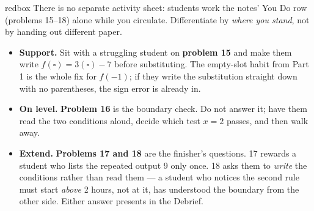 \documentclass[10pt]{article}
\begin{document}
\begin{skillbox}{redbox}
There is no separate activity sheet: students work the notes' You Do row
(problems 15--18) alone while you circulate. Differentiate by \textit{where you
stand}, not by handing out different paper.

\begin{itemize}
  \item \textbf{Support.} Sit with a struggling student on \textbf{problem 15}
        and make them write $f(\square) = 3(\square) - 7$ before substituting.
        The empty-slot habit from Part 1 is the whole fix for $f(-1)$; if they
        write the substitution straight down with no parentheses, the sign error
        is already in.
  \item \textbf{On level.} \textbf{Problem 16} is the boundary check. Do not
        answer it; have them read the two conditions aloud, decide which test
        $x = 2$ passes, and then walk away.
  \item \textbf{Extend.} \textbf{Problems 17 and 18} are the finisher's
        questions. 17 rewards a student who lists the repeated output 9 only
        once. 18 asks them to \textit{write} the conditions rather than read
        them --- a student who notices the second rule must start \emph{above}
        2 hours, not at it, has understood the boundary from the other side.
        Either answer presents in the Debrief.
\end{itemize}
\end{skillbox}
\end{document}

